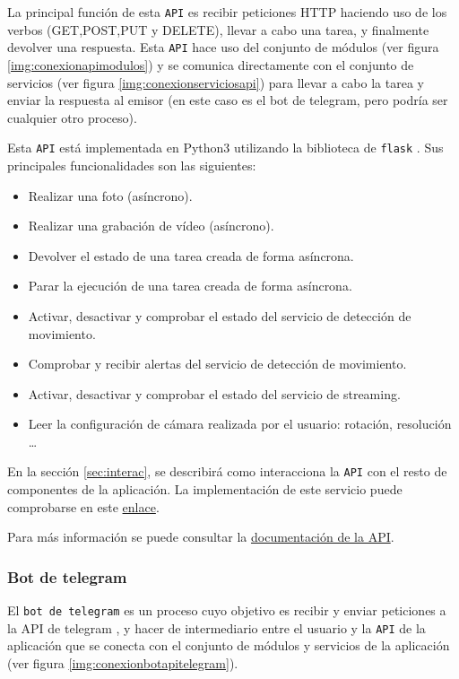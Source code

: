 La principal función de esta \texttt{API} es recibir peticiones HTTP haciendo uso de los verbos (GET,POST,PUT y DELETE), llevar a cabo una tarea, y finalmente devolver una respuesta. Esta \texttt{API} hace uso del conjunto de módulos (ver figura \ref{img:conexionapimodulos}) y se comunica directamente con el conjunto de servicios (ver figura \ref{img:conexionserviciosapi}) para llevar a cabo la tarea y enviar la respuesta al emisor (en este caso es el bot de telegram, pero podría ser cualquier otro proceso).

Esta \texttt{API} está implementada en Python3 utilizando la biblioteca de \texttt{flask} \cite{ref14}. Sus principales funcionalidades son las siguientes:

\begin{itemize}
\item Realizar una foto (asíncrono).
\item Realizar una grabación de vídeo (asíncrono).
\item Devolver el estado de una tarea creada de forma asíncrona.
\item Parar la ejecución de una tarea creada de forma asíncrona.
\item Activar, desactivar y comprobar el estado del servicio de detección de movimiento.
\item Comprobar y recibir alertas del servicio de detección de movimiento.
\item Activar, desactivar y comprobar el estado del servicio de streaming.
\item Leer la configuración de cámara realizada por el usuario: rotación, resolución \ldots
\end{itemize}

En la sección \ref{sec:interac}, se describirá como interacciona la \texttt{API} con el resto de componentes de la aplicación. La implementación de este servicio puede comprobarse en este \href{https://github.com/jmv74211/TFM_security_system_PI/blob/master/src/agents/api_agent.py}{enlace}.

Para más información se puede consultar la \href{https://github.com/jmv74211/TFM_security_system_PI/blob/master/doc/api/api_agent_doc.md}{documentación de la API}.

\subsubsection{Bot de telegram}

El \texttt{bot de telegram} es un proceso cuyo objetivo es recibir y enviar peticiones a la API de telegram \cite{ref31}, y hacer de intermediario entre el usuario y la \texttt{API} de la aplicación que se conecta con el conjunto de módulos y servicios de la aplicación (ver figura \ref{img:conexionbotapitelegram}).

